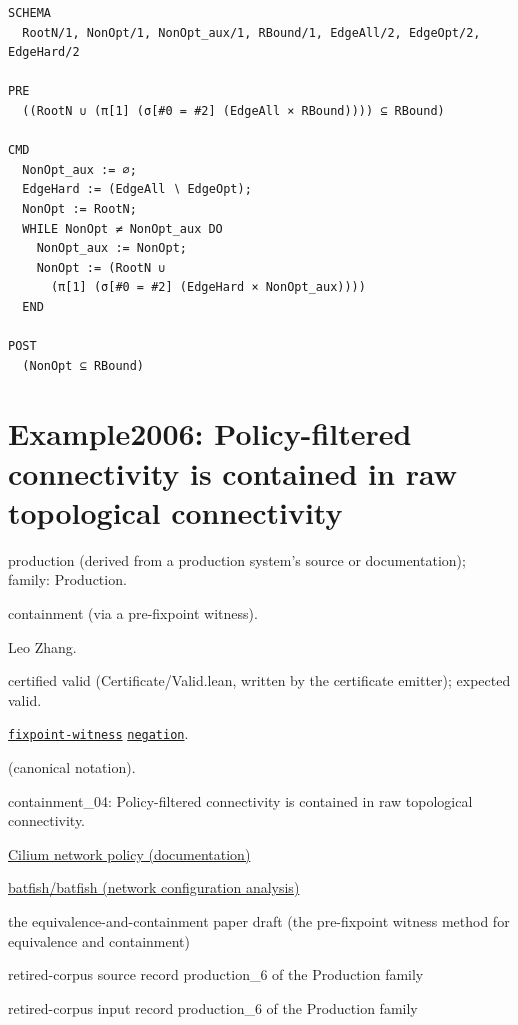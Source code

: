 \documentclass[10pt]{article}
\begin{document}
\begin{Verbatim}[fontsize=\scriptsize,breaklines=true,breakanywhere=true,frame=single,framesep=1.5mm]
SCHEMA
  RootN/1, NonOpt/1, NonOpt_aux/1, RBound/1, EdgeAll/2, EdgeOpt/2, EdgeHard/2

PRE
  ((RootN ∪ (π[1] (σ[#0 = #2] (EdgeAll × RBound)))) ⊆ RBound)

CMD
  NonOpt_aux := ∅;
  EdgeHard := (EdgeAll ∖ EdgeOpt);
  NonOpt := RootN;
  WHILE NonOpt ≠ NonOpt_aux DO
    NonOpt_aux := NonOpt;
    NonOpt := (RootN ∪
      (π[1] (σ[#0 = #2] (EdgeHard × NonOpt_aux))))
  END

POST
  (NonOpt ⊆ RBound)
\end{Verbatim}

\Needspace{0.45\textheight}

\section{Example2006: Policy-filtered connectivity is contained in raw topological connectivity}\label{case:Example2006}

\begin{description}[leftmargin=2.6cm,style=nextline,itemsep=1pt]

\item[Category] production (derived from a production system's source or documentation); family: Production.

\item[Kind] containment (via a pre-fixpoint witness).

\item[Contributors] Leo Zhang.

\item[Status] certified valid (Certificate/Valid.lean, written by the certificate emitter); expected valid.

\item[Tags] \hyperref[tag:fixpoint-witness]{\texttt{fixpoint-witness}} \hyperref[tag:negation]{\texttt{negation}}.

\item[Input]  (canonical notation).

\item[Summary] containment\_04: Policy-filtered connectivity is contained in raw topological connectivity.

\item[Sources] {\raggedright \href{https://docs.cilium.io/en/stable/security/policy/}{Cilium network policy (documentation)} \par \href{https://github.com/batfish/batfish}{batfish/batfish (network configuration analysis)} \par the equivalence-and-containment paper draft (the pre-fixpoint witness method for equivalence and containment) \par retired-corpus source record production\_6 of the Production family \par retired-corpus input record production\_6 of the Production family\par}

\end{description}
\end{document}

